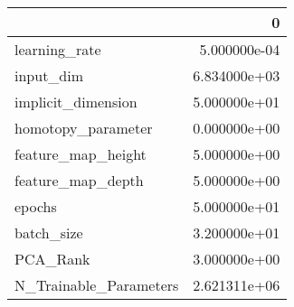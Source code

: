 \begin{tabular}{lr}
\toprule
{} &             0 \\
\midrule
learning\_rate          &  5.000000e-04 \\
input\_dim              &  6.834000e+03 \\
implicit\_dimension     &  5.000000e+01 \\
homotopy\_parameter     &  0.000000e+00 \\
feature\_map\_height     &  5.000000e+00 \\
feature\_map\_depth      &  5.000000e+00 \\
epochs                 &  5.000000e+01 \\
batch\_size             &  3.200000e+01 \\
PCA\_Rank               &  3.000000e+00 \\
N\_Trainable\_Parameters &  2.621311e+06 \\
\bottomrule
\end{tabular}
